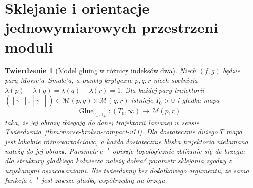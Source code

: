 \documentclass[11pt,a4paper,oneside]{report}
\theoremstyle{plain}
\newtheorem{twierdzenie}{Twierdzenie}[section]
\theoremstyle{definition}
\theoremstyle{remark}
\begin{document}
\section{Sklejanie i orientacje jednowymiarowych przestrzeni moduli}
\begin{twierdzenie}[Model gluing w różnicy indeksów dwa]
\label{thm:morse-gluing-v11}
Niech $(f,g)$ będzie parą Morse'a--Smale'a, a punkty
krytyczne $p,q,r$ niech spełniają
$\lambda(p)-\lambda(q)=\lambda(q)-\lambda(r)=1$.
Dla każdej pary trajektorii
$([\gamma_-],[\gamma_+])\in
\mathcal M(p,q)\times\mathcal M(q,r)$
istnieje $T_0>0$ i gładka mapa
\[
\operatorname{Glue}_{\gamma_-,\gamma_+}:
(T_0,\infty)\longrightarrow\mathcal M(p,r)
\]
taka, że jej obrazy zbiegają do danej trajektorii łamanej
w sensie Twierdzenia~\ref{thm:morse-broken-compact-v11}.
Dla dostatecznie dużego $T$ mapa jest lokalnie różnowartościowa,
a każda dostatecznie bliska trajektoria niełamana należy do
jej obrazu. Parametr $e^{-T}$ opisuje topologicznie zbliżanie się do
brzegu; dla struktury gładkiego kołnierza należy dobrać
parametr sklejania zgodny z uzyskanymi oszacowaniami.
Nie twierdzimy bez dodatkowego argumentu, że sama funkcja
$e^{-T}$ jest zawsze gładką współrzędną na brzegu.
\end{twierdzenie}
\end{document}
